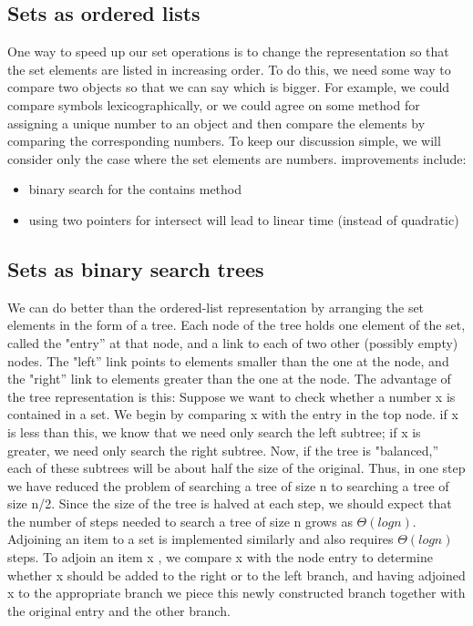 \documentclass[a4paper,twoside]{article}
\numberwithin{equation}{section}
\begin{document}
\subsection{Sets as ordered lists}
One way to speed up our set operations is to change the representation so that the set elements
are listed in increasing order. To do this, we need some way to compare two objects so that
we can say which is bigger. For example, we could compare symbols lexicographically, or we
could agree on some method for assigning a unique number to an object and then compare the
elements by comparing the corresponding numbers. To keep our discussion simple, we will consider
only the case where the set elements are numbers. improvements include:
\begin{itemize}
    \item binary search for the contains method
    \item using two pointers for intersect will lead to linear time (instead of quadratic)
\end{itemize}

\subsection{Sets as binary search trees}
We can do better than the ordered-list representation by arranging the set elements in the form
of a tree. Each node of the tree holds one element of the set, called the "entry” at that node,
and a link to each of two other (possibly empty) nodes. The "left” link points to elements smaller
than the one at the node, and the "right” link to elements greater than the one at the node.
The advantage of the tree representation is this: Suppose we want to
check whether a number x is contained in a set. We begin by comparing
x with the entry in the top node. if x is less than this, we know that we
need only search the left subtree; if x is greater, we need only search
the right subtree. Now, if the tree is "balanced,” each of these subtrees
will be about half the size of the original. Thus, in one step we have
reduced the problem of searching a tree of size n to searching a tree
of size n/2. Since the size of the tree is halved at each step, we should
expect that the number of steps needed to search a tree of size n grows
as $\Theta(log n)$.
Adjoining an item to a set is implemented similarly and also requires $\Theta(log n)$ steps.
To adjoin an item x , we compare x with the node entry to determine whether x should be added to
the right or to the left branch, and having adjoined x to the appropriate branch we piece this
newly constructed branch together with the original entry and the other branch.
\end{document}

